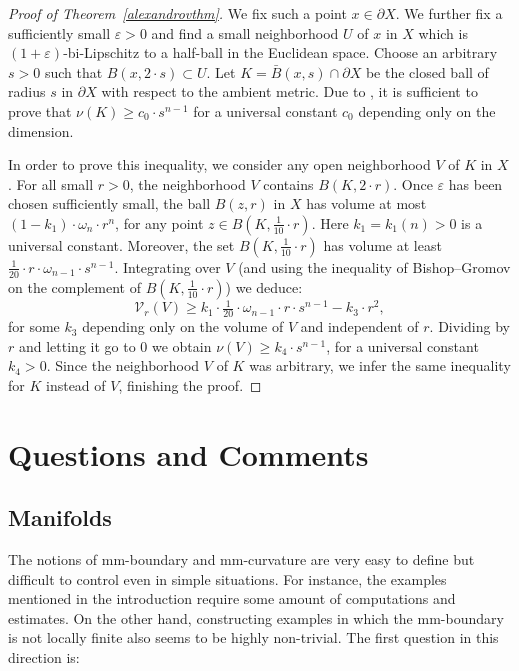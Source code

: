 \documentclass[12pt,leqno,intlimits]{amsart}
\numberwithin{equation}{section}
\theoremstyle{definition}
\theoremstyle{remark}
\begin{document}
\begin{proof}[Proof of Theorem~\ref{alexandrovthm}]
We fix such a point $x\in \partial X$. We further fix a sufficiently small $\varepsilon >0$ and find
a small neighborhood $U$ of $x$ in $X$ which is
$(1+\varepsilon)$-bi-Lipschitz to a half-ball in the Euclidean space. Choose an arbitrary $s>0$ such that $B (x,{2{\cdot}s})\subset U$.
Let $K= \bar B (x,s) \cap \partial X$ be the closed ball of radius $s$ in $\partial X$ with respect to the ambient metric.
Due to \cite[Section 1.6]{Evans}, it is sufficient to prove that $\nu (K) \geq c_0 \cdot s^{n-1}$ for a universal constant $c_0$ depending only on the dimension.

In order to prove this inequality, we consider any open neighborhood $V$ of $K$ in $X$.
For all small $r>0$, the neighborhood $V$ contains $B (K,{2{\cdot}r})$.
Once $\varepsilon$ has been chosen sufficiently small, the ball $B (z,r)$ in $X$ has volume at most
$ (1-k_1) \cdot \omega _n \cdot r^n$, for
any point $z\in B (K,{\frac 1 {10}{\cdot}r})$. Here $ k_1=k_1(n)>0 $ is a universal constant.
 Moreover, the set $B (K,{\frac 1 {10}{\cdot}r})$ has volume at least
 $\frac 1 {20} \cdot r \cdot \omega _{n-1} \cdot s^{n-1}$.
Integrating over $V$ (and using the inequality of Bishop--Gromov on the complement of $B (K,{\frac 1 {10}{\cdot}r})$) we deduce:
$$\mathcal{V}_r (V) \geq k_1\cdot \tfrac 1 {20} \cdot \omega _{n-1} \cdot r\cdot s^{n-1} - k_3 \cdot r^2 ,$$
for some $k_3$ depending only on the volume of $V$ and independent of $r$.
Dividing by $r$ and letting it go to $0$ we obtain $\nu (V) \geq k_4\cdot s^{n-1}$, for a universal constant $k_4>0$.
Since the neighborhood $V$ of $K$ was arbitrary,
we infer the same inequality for $K$ instead of $V$, finishing the proof.
\end{proof}

\section{Questions and Comments} \label{sec:final}
\subsection{Manifolds}
The notions of mm-boundary and mm-curvature are very easy to define but difficult to control even in simple situations.
For instance, the examples mentioned in the introduction require some amount of computations and estimates. On the other hand, constructing examples in which the mm-boundary is not locally finite also seems to be highly non-trivial. The first question in this direction is:
\end{document}
